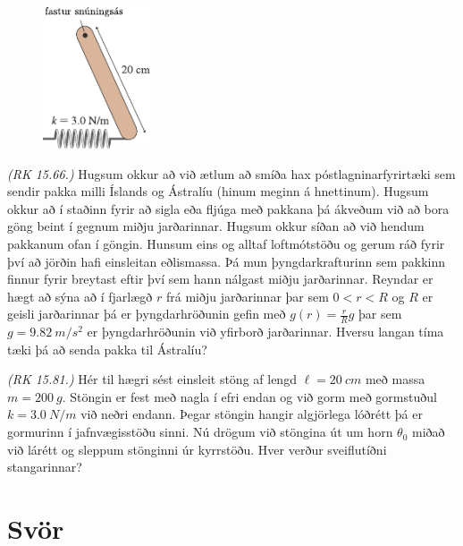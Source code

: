 \begin{enumerate}[label = \textbf{Dæmi \thechapter.\arabic*.}]
\begin{minipage}{\linewidth}

\begin{figure}
\vspace{0.5cm}
\includegraphics[width=1.25in]{figures/fastur-snunas.pdf}
\end{figure}

\item \textit{(RK 15.66.)} Hugsum okkur að við ætlum að smíða hax póstlagninarfyrirtæki sem sendir pakka milli Íslands og Ástralíu (hinum meginn á hnettinum). Hugsum okkur að í staðinn fyrir að sigla eða fljúga með pakkana þá ákveðum við að bora göng beint í gegnum miðju jarðarinnar. Hugsum okkur síðan að við hendum pakkanum ofan í göngin. Hunsum eins og alltaf loftmótstöðu og gerum ráð fyrir því að jörðin hafi einsleitan eðlismassa. Þá mun þyngdarkrafturinn sem pakkinn finnur fyrir breytast eftir því sem hann nálgast miðju jarðarinnar. Reyndar er hægt að sýna að í fjarlægð $r$ frá miðju jarðarinnar þar sem $0 < r < R$ og $R$ er geisli jarðarinnar þá er þyngdarhröðunin gefin með $g(r) = \frac{r}{R}g$ þar sem $g = \SI{9.82}{m/s^2}$ er þyngdarhröðunin við yfirborð jarðarinnar. Hversu langan tíma tæki þá að senda pakka til Ástralíu?

\item \textit{(RK 15.81.)} Hér til hægri sést einsleit stöng af lengd $\ell = \SI{20}{cm}$ með massa $m = \SI{200}{g}$. Stöngin er fest með nagla í efri endan og við gorm með gormstuðul $k = \SI{3.0}{N/m}$ við neðri endann. Þegar stöngin hangir algjörlega lóðrétt þá er gormurinn í jafnvægisstöðu sinni. Nú drögum við stöngina út um horn $\theta_0$ miðað við lárétt og sleppum stönginni úr kyrrstöðu. Hver verður sveiflutíðni stangarinnar?

\end{minipage}

\end{enumerate}


\section*{Svör}

